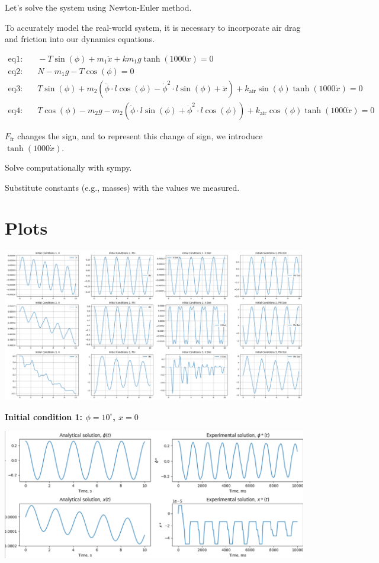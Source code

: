 \documentclass{article}
\begin{document}
Let's solve the system using Newton-Euler method.

To accurately model the real-world system, it is necessary to incorporate air drag and friction into our dynamics equations.

\begin{align*}
  \text{eq1:} & \quad -T \sin(\phi) + m_1 \ddot{x} + k m_1 g \tanh(1000 \dot{x}) = 0 \\
  \text{eq2:} & \quad N - m_1 g - T \cos(\phi) = 0 \\
  \text{eq3:} & \quad T \sin(\phi) + m_2 \left(\ddot{\phi} \cdot l \cos(\phi) - \dot{\phi}^2 \cdot l \sin(\phi) + \ddot{x}\right) + k_{\text{air}} \sin(\phi) \tanh(1000 \dot{x}) = 0 \\
  \text{eq4:} & \quad T \cos(\phi) - m_2 g - m_2 \left(\ddot{\phi} \cdot l \sin(\phi) + \dot{\phi}^2 \cdot l \cos(\phi)\right) + k_{\text{air}} \cos(\phi) \tanh(1000 \dot{x}) = 0
\end{align*}
  
$F_\text{fr}$ changes the sign, and to represent this change of sign, we introduce $\tanh(1000 \dot{x})$.

Solve computationally with sympy.

Substitute constants (e.g., masses) with the values we measured.

\section{Plots}
\includegraphics*[scale=0.25]{graphics/results.png}

\textbf{Initial condition 1: $\phi = 10^\circ$, $x = 0$}

\includegraphics*[scale=0.25]{graphics/res_comparison_init1.png}
\end{document}
